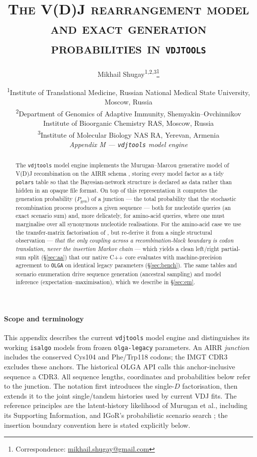 \documentclass[11pt]{article}
\title{\scshape The V(D)J rearrangement model and exact generation probabilities in \texttt{vdjtools}}
\author{Mikhail Shugay\textsuperscript{1,2,3}\thanks{Correspondence:
  \href{mailto:mikhail.shugay@gmail.com}{mikhail.shugay@gmail.com}}}
\date{%
  \small
  \textsuperscript{1}Institute of Translational Medicine, Russian National Medical State University, Moscow, Russia\\
  \textsuperscript{2}Department of Genomics of Adaptive Immunity, Shemyakin--Ovchinnikov Institute of Bioorganic Chemistry RAS, Moscow, Russia\\
  \textsuperscript{3}Institute of Molecular Biology NAS RA, Yerevan, Armenia\\[6pt]
  \normalsize\textit{Appendix M --- \texttt{vdjtools} model engine}%
}
\theoremstyle{oldplain}
\theoremstyle{oldrem}
\newcommand{\Pgen}{P_{\mathrm{gen}}}
\begin{document}
\maketitle

\begin{abstract}
\noindent
The \texttt{vdjtools} model engine implements the Murugan--Marcou generative model of V(D)J
recombination \cite{Murugan2012,Marcou2018} on the AIRR schema \cite{VanderHeiden2018}, storing every
model factor as a tidy \texttt{polars} table so that the Bayesian-network structure is declared as data
rather than hidden in an opaque file format. On top of this representation it computes the generation
probability ($\Pgen$) of a junction --- the total probability that the stochastic recombination process
produces a given sequence --- both for nucleotide queries (an exact scenario sum) and, more delicately,
for amino-acid queries, where one must marginalise over all synonymous nucleotide realisations. For the
amino-acid case we use the transfer-matrix factorisation of \cite{Sethna2019}, but re-derive
it from a single structural observation --- \emph{that the only coupling across a recombination-block
boundary is codon translation, never the insertion Markov chain} --- which yields a clean left/right
partial-sum split (\S\ref{sec:aa}) that our native C++ core evaluates with machine-precision agreement to \texttt{OLGA} on identical legacy parameters
(\S\ref{sec:bench}). The same tables and scenario enumeration
drive sequence generation (ancestral sampling) and model inference (expectation--maximisation), which we
describe in \S\ref{sec:em}.
\end{abstract}

\paragraph{Scope and terminology} This appendix describes the current
\texttt{vdjtools} model engine and distinguishes its working \texttt{isalgo} models from frozen
\texttt{olga-legacy} parameters.
An AIRR \emph{junction} includes the conserved Cys104 and Phe/Trp118 codons;
the IMGT CDR3 excludes these anchors.
The historical OLGA API calls this anchor-inclusive sequence a CDR3.
All sequence lengths, coordinates and probabilities below refer to the junction.
The notation first introduces the single-$D$ factorisation, then extends it to the
joint single/tandem histories used by current VDJ fits.
The reference principles are the latent-history likelihood of Murugan et al.,
including its Supporting Information, and IGoR's probabilistic scenario search
\cite{Murugan2012,Marcou2018}; the insertion boundary convention here is stated explicitly below.
\end{document}
